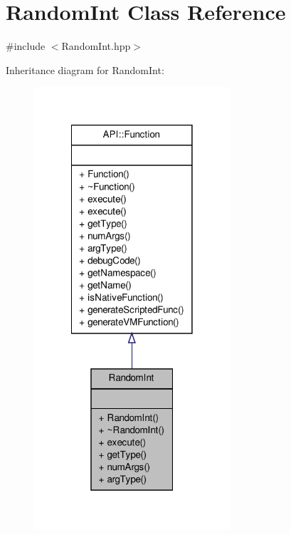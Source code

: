 \hypertarget{class_random_int}{\section{Random\-Int Class Reference}
\label{class_random_int}
}


{\ttfamily \#include $<$Random\-Int.\-hpp$>$}



Inheritance diagram for Random\-Int\-:
\nopagebreak
\begin{figure}[H]
\begin{center}
\leavevmode
\includegraphics[width=206pt]{class_random_int__inherit__graph}
\end{center}
\end{figure}


